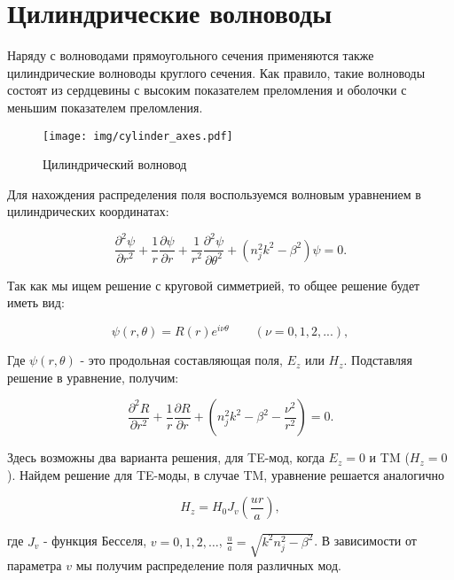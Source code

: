 \section{Цилиндрические волноводы}
\label{cylinder_waveguides}
Наряду с волноводами прямоугольного сечения применяются также цилиндрические волноводы круглого сечения. Как правило, такие волноводы состоят из сердцевины с высоким показателем преломления и оболочки с меньшим показателем преломления. 

\begin{figure}[h!]
	\texttt{[image: img/cylinder\_axes.pdf]}
	\caption{Цилиндрический волновод}
\end{figure}

Для нахождения распределения поля воспользуемся волновым уравнением в цилиндрических координатах:

\begin{equation}
	\frac{\partial^2\psi}{\partial r^2} + \frac{1}{r}\frac{\partial\psi}{\partial r}+\frac{1}{r^2}\frac{\partial^2\psi}{\partial\theta^2}+(n_j^2 k^2 - \beta^2)\psi = 0.
\end{equation}

Так как мы ищем решение с круговой симметрией, то общее решение будет иметь вид:

\begin{equation}
	\psi(r, \theta) = R(r)e^{i\nu\theta} \qquad (\nu = 0,1,2, ...),
\end{equation}

Где $\psi(r, \theta)$ - это продольная составляющая поля, $E_z$ или $H_z$. Подставляя решение в уравнение, получим:

\begin{equation}
	\frac{\partial^2 R}{\partial r^2} + \frac{1}{r}\frac{\partial R}{\partial r}+(n_j^2 k^2 - \beta^2 - \frac{\nu^2}{r^2}) = 0.
\end{equation}

Здесь возможны два варианта решения, для TE-мод, когда $E_z = 0$ и TM ($H_z = 0$). Найдем решение для TE-моды, в случае TM, уравнение решается аналогично

\begin{equation}
	H_z = H_0 J_v (\frac{ur}{a}),
	\label{cylinder_bessel}
\end{equation}

где $J_v$ - функция Бесселя, $v = 0, 1, 2,\ldots$, $\frac{u}{a} = \sqrt{k^2 n_j^2 - \beta^2}$. В зависимости от параметра $v$ мы получим распределение поля различных мод.